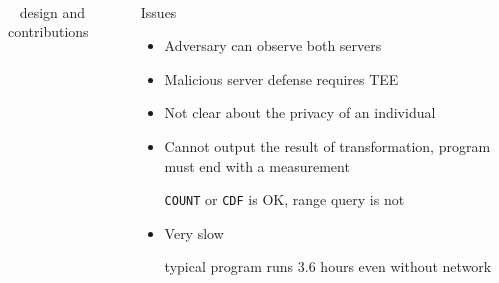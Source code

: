 \begin{frame}{\crypte~\cite{crypte}}
\begin{columns}[T,onlytextwidth]
\begin{block}{\crypte~\cite{crypte} design and contributions}
					\end{block}


					\begin{block}{Issues}

						\begin{itemize}
							\item Adversary can observe both servers
							\item Malicious server defense requires TEE
							\item Not clear about the privacy of an individual
							\item Cannot output the result of transformation, program must end with a measurement \\
								\begin{small}
									\texttt{COUNT} or \texttt{CDF} is OK, range query is not
								\end{small}
							\item Very slow \\
							\begin{small}
								typical program runs 3.6 hours even without network
							\end{small}
						\end{itemize}

					\end{block}

			\end{columns}

		\end{frame}

